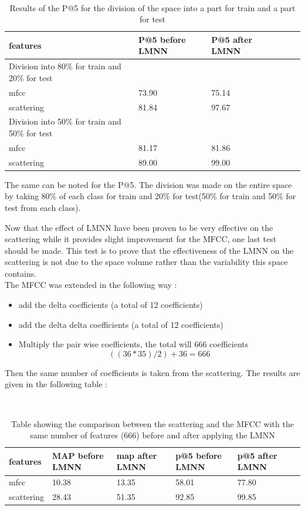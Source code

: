 \documentclass[hidelinks,12pt]{report}
\begin{document}
\begin{table} [H]
\begin{center} 
\ 
 \setlength{\tabcolsep}{.16667em} 
\begin{tabular}{ | l | l | l | l | l |l|}
\hline
features & P@5 before LMNN & P@5 after LMNN  \\ 
\hline 
Division into 80\% for train and 20\% for test \\
\hline
mfcc & 73.90& 75.14  \\ 
scattering &81.84& 97.67    \\ 
\hline
Division into 50\% for train and 50\% for test \\
\hline
mfcc & 81.17& 81.86  \\ 
scattering & 89.00 & 99.00  \\ 
\hline
\end{tabular} 
\end{center} 
\caption{Results of the P@5 for the division of the space into a part for train and a part for test} 
\label{you} 
\end{table} 
The same can be noted for the P@5. The division was made on the entire space by taking 80\% of each class for train and 20\% for test(50\% for train and 50\% for test from each class). \par
Now that the effect of LMNN have been proven to be very effective on the scattering while it provides slight improvement for the MFCC, one last test should be made. This test is to prove that the effectiveness of the LMNN on the scattering is not due to the space volume rather than the variability this space contains. \\
The MFCC was extended in the following way :
\begin{itemize}
\item add the delta coefficients (a total of 12 coefficients) 
\item add the delta delta coefficients (a total of 12 coefficients)
\item Multiply the pair wise coefficients, the total will 666 coefficients $$((36*35)/2)+36=666$$
\end{itemize}
Then the same number of coefficients is taken from the scattering. The results are given in the following table : 
\begin{table} [H]
\begin{center} 
\ 
 \setlength{\tabcolsep}{.16667em} 
\begin{tabular}{ | l | l | l | l | l | l |}
\hline
features & MAP before LMNN& map after LMNN & p@5 before LMNN & p@5 after LMNN \\ 
\hline 
mfcc & 10.38 & 13.35 & 58.01 & 77.80 \\ 
scattering & 28.43 & 51.35 & 92.85 & 99.85  \\ 
\hline
\end{tabular} 
\end{center} 
\caption{Table showing the comparison between the scattering and the MFCC with the same number of features (666) before and after applying the LMNN} 
\label{you} 
\end{table} 
\end{document}
